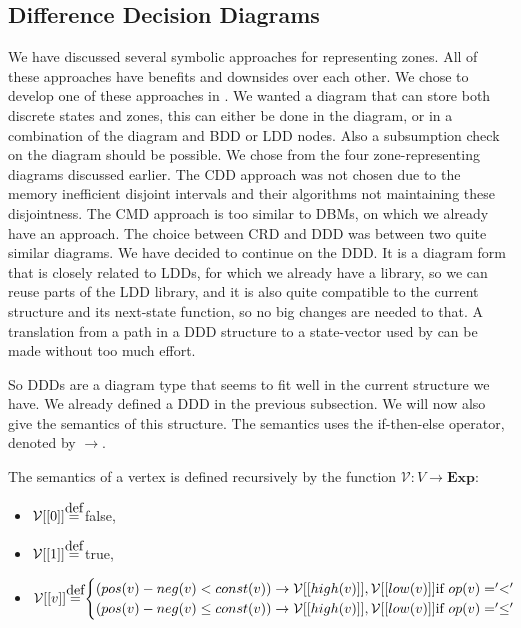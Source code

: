 \subsection{Difference Decision Diagrams}

We have discussed several symbolic approaches for representing zones. All of these approaches have benefits and downsides over each other. We chose to develop one of these approaches in \ltsmin{}. We wanted a diagram that can store both discrete states and zones, this can either be done in the diagram, or in a combination of the diagram and BDD or LDD nodes. Also a subsumption check on the diagram should be possible. We chose from the four zone-representing diagrams discussed earlier. The CDD approach was not chosen due to the memory inefficient disjoint intervals and their algorithms not maintaining these disjointness. The CMD approach is too similar to DBMs, on which we already have an approach. The choice between CRD and DDD was between two quite similar diagrams. We have decided to continue on the DDD. It is a diagram form that is closely related to LDDs, for which we already have a library, so we can reuse parts of the LDD library, and it is also quite compatible to the current \pins{} structure and its next-state function, so no big changes are needed to that. A translation from a path in a DDD structure to a state-vector used by \ltsmin{} can be made without too much effort. %

So DDDs are a diagram type that seems to fit well in the current structure we have. We already defined a DDD in the previous subsection. We will now also give the semantics of this structure. The semantics uses the if-then-else operator, denoted by $\rightarrow$.

\begin{mydef}
\label{def:Semantics1}
The semantics of a vertex is defined recursively by the function $\mathcal{V}: V \rightarrow \textbf{Exp}:$
\begin{itemize}
\item $\mathcal{V}[[0]] \myeq$ false,
\item $\mathcal{V}[[1]] \myeq$ true,
\item \begin{math} \mathcal{V}[[v]] \myeq
\begin{cases}
(pos(v) - neg(v) < const(v)) \rightarrow \mathcal{V}[[high(v)]],\mathcal{V}[[low(v)]]\text{if }op(v) = '<'\\
(pos(v) - neg(v) \leq const(v)) \rightarrow \mathcal{V}[[high(v)]],\mathcal{V}[[low(v)]]\text{if }op(v) = '\leq'
\end{cases}
\end{math}
\end{itemize}
\end{mydef}

